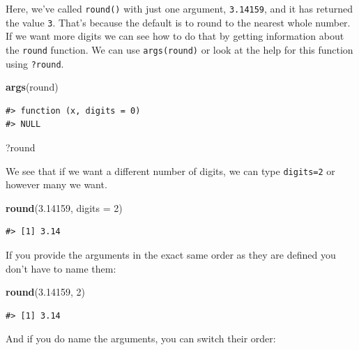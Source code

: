 \documentclass[
]{book}
\newenvironment{Shaded}{\begin{snugshade}}{\end{snugshade}}
\newcommand{\AttributeTok}[1]{\textcolor[rgb]{0.13,0.29,0.53}{#1}}
\newcommand{\DecValTok}[1]{\textcolor[rgb]{0.00,0.00,0.81}{#1}}
\newcommand{\FloatTok}[1]{\textcolor[rgb]{0.00,0.00,0.81}{#1}}
\newcommand{\FunctionTok}[1]{\textcolor[rgb]{0.13,0.29,0.53}{\textbf{#1}}}
\newcommand{\NormalTok}[1]{#1}
\begin{document}
Here, we've called \texttt{round()} with just one argument, \texttt{3.14159}, and it has
returned the value \texttt{3}. That's because the default is to round to the nearest
whole number. If we want more digits we can see how to do that by getting
information about the \texttt{round} function. We can use \texttt{args(round)} or look at the
help for this function using \texttt{?round}.

\begin{Shaded}
\begin{Highlighting}[]
\FunctionTok{args}\NormalTok{(round)}
\end{Highlighting}
\end{Shaded}

\begin{verbatim}
#> function (x, digits = 0) 
#> NULL
\end{verbatim}

\begin{Shaded}
\begin{Highlighting}[]
\NormalTok{?round}
\end{Highlighting}
\end{Shaded}

We see that if we want a different number of digits, we can
type \texttt{digits=2} or however many we want.

\begin{Shaded}
\begin{Highlighting}[]
\FunctionTok{round}\NormalTok{(}\FloatTok{3.14159}\NormalTok{, }\AttributeTok{digits =} \DecValTok{2}\NormalTok{)}
\end{Highlighting}
\end{Shaded}

\begin{verbatim}
#> [1] 3.14
\end{verbatim}

If you provide the arguments in the exact same order as they are defined you
don't have to name them:

\begin{Shaded}
\begin{Highlighting}[]
\FunctionTok{round}\NormalTok{(}\FloatTok{3.14159}\NormalTok{, }\DecValTok{2}\NormalTok{)}
\end{Highlighting}
\end{Shaded}

\begin{verbatim}
#> [1] 3.14
\end{verbatim}

And if you do name the arguments, you can switch their order:
\end{document}
